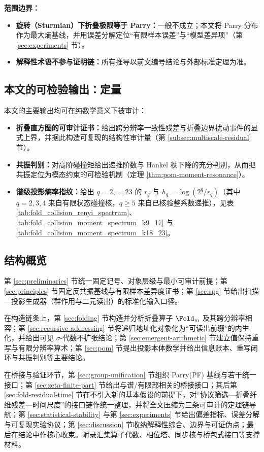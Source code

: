 \textbf{范围边界：}
\begin{itemize}
  \item \textbf{旋转（Sturmian）下折叠极限等于 Parry：}一般不成立；本文将 Parry 分布作为最大熵基线，并用误差分解定位“有限样本误差”与“模型差异项”（第 \ref{sec:experiments} 节）。
  \item \textbf{解释性术语不参与证明链：}所有推导以前文编号结论与外部标准定理为准。
\end{itemize}

\subsection{本文的可检验输出：定量}
本文的主要输出均可在纯数学意义下被审计：
\begin{itemize}
  \item \textbf{折叠直方图的可审计证书：}给出跨分辨率一致性残差与折叠边界扰动事件的显式上界，并据此构造可复现的结构性审计量（第 \ref{subsec:multiscale-residual} 节）。
  \item \textbf{共振判别：}对高阶碰撞矩给出递推阶数与 Hankel 秩下降的充分判别，从而把共振定位为模态约束的可检验机制（定理 \ref{thm:pom-moment-resonance}）。
  \item \textbf{谱级投影熵率指纹：}给出 \(q=2,\dots,23\) 的 \(r_q\) 与 \(h_q=\log(2^q/r_q)\)（其中 \(q=2,3,4\) 来自有限状态碰撞核，\(q\ge 5\) 来自已核验整系数递推），见表 \ref{tab:fold_collision_renyi_spectrum}、\ref{tab:fold_collision_moment_spectrum_k9_17} 与 \ref{tab:fold_collision_moment_spectrum_k18_23}。
\end{itemize}

\subsection{结构概览}
第 \ref{sec:preliminaries} 节统一固定记号、对象层级与最小可审计前提；第 \ref{sec:principles} 节固定反共振基线与有限样本差异度证书；第 \ref{sec:spg} 节给出扫描—投影生成器（群作用与二元读出）的标准化输入口径。\par
在构造链条上，第 \ref{sec:folding} 节构造并分析折叠算子 \(\Fold_m\) 及其跨分辨率相容；第 \ref{sec:recursive-addressing} 节将递归地址化对象化为“可读出前缀”的内生化，并给出可见 \(\sigma\)-代数不扩张结论；第 \ref{sec:emergent-arithmetic} 节建立值保持重写与有限分辨率算术；第 \ref{sec:pom} 节提出投影本体数学并给出信息账本、重写闭环与共振判别等主要结论。\par
在桥接与验证环节，第 \ref{sec:group-unification} 节组织 Parry(PF) 基线与若干统一接口；第 \ref{sec:zeta-finite-part} 节给出与谱/有限部相关的桥接接口；其后第 \ref{sec:fold-residual-time} 节在不引入新的基本假设的前提下，对“协议筛选—折叠纤维残差—时间尺度”的接口链作统一整理，并将全文压缩为三条可审计的定理链导航；第 \ref{sec:statistical-stability} 与第 \ref{sec:experiments} 节给出偏差指标、误差分解与可复现实验协议；第 \ref{sec:discussion} 节收纳解释性综合、边界与可证伪点；最后在结论中作核心收束。附录汇集算子代数、相位塔、同步核与桥包式接口等支撑材料。

